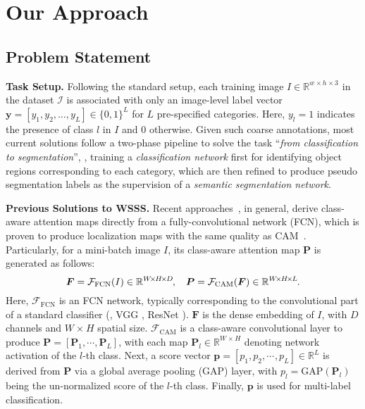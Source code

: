 \documentclass[10pt,twocolumn,letterpaper]{article}
\begin{document}
\section{Our Approach}\label{sec:method}


\subsection{Problem Statement}\label{sec:prob}



\noindent\textbf{Task Setup.}  Following the standard setup, each training image ${I}\!\in\!\mathbb{R}^{w_{\!} \times h_{\!} \times 3_{\!}}$ in the dataset $\mathcal{I}$ is associated with only an image-level label vector $\bm{y}\!=\![y_{1}, y_{2},\ldots, y_{L}]\!\in\!\{0,1\}^L$ for $L$ pre-specified  categories. Here, $y_{l}\!=\!1$ indicates the presence of class $l$ in $I$ and $0$ otherwise. Given such coarse annotations, most current solutions follow a  two-phase pipeline to solve the task ``\textit{from classification to segmentation}'', \ie, training a \textit{classification network} first for identifying object regions corresponding to each category, which are then refined to produce pseudo segmentation labels as the supervision of a \textit{semantic segmentation network}. 




\noindent\textbf{Previous Solutions to \mbox{WSSS}.} 
Recent approaches~\cite{jiang2019integral,Zhang_2018,lee2021railroad}, in general, derive class-aware attention maps directly from a fully-convolutional network (\mbox{FCN}), which is proven to produce localization maps with the same quality as \mbox{CAM}~\cite{Zhang_2018}. Particularly, for a mini-batch image ${I}$, its class-aware attention map $\bm{P}$ is generated as follows:
\begin{equation}\small\label{eq:cam}
	\bm{F} = \mathcal{F}_{\text{FCN}}({I})\in\mathbb{R}^{W_{\!} \times_{\!} H_{\!} \times_{\!} D_{\!}}, ~~~
	\bm{P} = \mathcal{F}_{\text{CAM}}(\bm{F})\in\mathbb{R}^{W_{\!} \times_{\!} H_{\!} \times_{\!} L_{\!}}.
\end{equation}
Here, $\mathcal{F}_{\text{FCN}}$ is an FCN network, typically corresponding to the convolutional part of a standard classifier (\eg, VGG \cite{simonyan2014very}, ResNet \cite{he2016deep}).  $\bm{F}$ is the dense  embedding of ${I}$, with $D$ channels and $W_{\!} \times_{\!} H$ spatial size. $\mathcal{F}_{\text{CAM}}$ is a class-aware convolutional layer to produce $\bm{P} \!=\! [\bm{P}_1, \cdots, \bm{P}_L]$, with each map $\bm{P}_l\!\in\!\mathbb{R}^{W_{\!} \times_{\!} H}$ denoting network activation of the $l$-th class. Next, a score vector $\bm{p}\!=\![p_{1},p_{2},\cdots_{\!},p_L]\!\in\!\mathbb{R}^{L}$ is derived from $\bm{P}$ via a global average pooling (GAP) layer, with $p_l\!=\!\text{GAP}(\bm{P}_l)$ being the un-normalized score of the $l$-th class. Finally, $\bm{p}$ is used for multi-label classification.
\end{document}
